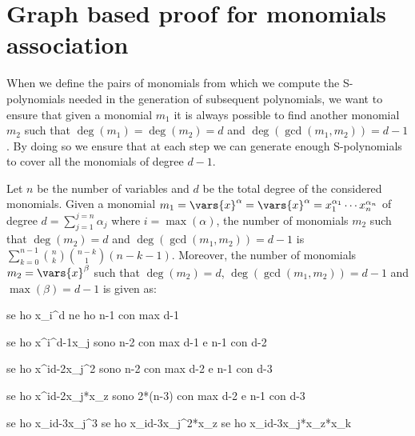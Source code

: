 \section{Graph based proof for monomials association}

When we define the pairs of monomials from which we compute the S-polynomials needed in the generation of subsequent polynomials, we want to ensure that given a monomial \(m_1\) it is always possible to find another monomial \(m_2\) such that \(\deg(m_1) = \deg(m_2) = d\) and \(\deg(\gcd(m_1,m_2)) = d-1\).
By doing so we ensure that at each step we can generate enough S-polynomials to cover all the monomials of degree \(d-1\).

\begin{lemma}
\label{lem:ditance-one-monomials}
Let \(n\) be the number of variables and \(d\) be the total degree of the considered monomials.
Given a monomial \(m_1 = \vars{x}^\alpha = \vars{x}^\alpha = x_1^{\alpha_1}\cdots x_n^{\alpha_n}\) of degree \(d = \sum_{j = 1}^{j=n} \alpha_j\) where \(i = \max(\alpha)\), the number of monomials \(m_2\) such that \(\deg(m_2) = d\) and \(\deg(\gcd(m_1,m_2)) = d-1\) is \(\sum_{k=0}^{n-1}\binom{n}{k}\binom{n-k}{1}(n-k-1)\). Moreover, the number of monomials \(m_2 = \vars{x}^{\beta}\) such that \(\deg(m_2) = d\), \(\deg(\gcd(m_1,m_2)) = d-1\) and \(\max(\beta) = d-1\) is given as:
\[

\]
\end{lemma}



se ho x_i^d ne ho n-1 con max d-1

se ho x^i^{d-1}x_j sono n-2 con max d-1 e n-1 con d-2

se ho x^i{d-2}x_j^2 sono n-2 con max d-2 e n-1 con d-3

se ho x^i{d-2}x_j*x_z sono 2*(n-3) con max d-2 e n-1 con d-3

se ho x_i{d-3}x_j^3 
se ho x_i{d-3}x_j^2*x_z
se ho x_i{d-3}x_j*x_z*x_k
 


